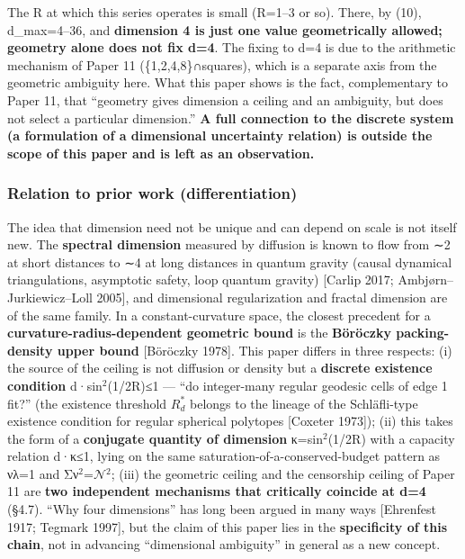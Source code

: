 \documentclass[
]{ltjsarticle}
\begin{document}
The R at which this series operates is small (R=1--3 or so). There, by
(10), d\_max=4--36, and \textbf{dimension 4 is just one value
geometrically allowed; geometry alone does not fix d=4}. The fixing to
d=4 is due to the arithmetic mechanism of Paper 11
(\{1,2,4,8\}∩squares), which is a separate axis from the geometric
ambiguity here. What this paper shows is the fact, complementary to
Paper 11, that ``geometry gives dimension a ceiling and an ambiguity,
but does not select a particular dimension.'' \textbf{A full connection
to the discrete system (a formulation of a dimensional uncertainty
relation) is outside the scope of this paper and is left as an
observation.}

\subsubsection{Relation to prior work
(differentiation)}\label{relation-to-prior-work-differentiation}

The idea that dimension need not be unique and can depend on scale is
not itself new. The \textbf{spectral dimension} measured by diffusion is
known to flow from ∼2 at short distances to ∼4 at long distances in
quantum gravity (causal dynamical triangulations, asymptotic safety,
loop quantum gravity) {[}Carlip 2017; Ambjørn--Jurkiewicz--Loll 2005{]},
and dimensional regularization and fractal dimension are of the same
family. In a constant-curvature space, the closest precedent for a
\textbf{curvature-radius-dependent geometric bound} is the
\textbf{Böröczky packing-density upper bound} {[}Böröczky 1978{]}. This
paper differs in three respects: (i) the source of the ceiling is not
diffusion or density but a \textbf{discrete existence condition}
d·sin\(^{2}\)(1/2R)≤1 --- ``do integer-many regular geodesic cells of
edge 1 fit?'' (the existence threshold \(R^{*}_{d}\) belongs to the
lineage of the Schläfli-type existence condition for regular spherical
polytopes {[}Coxeter 1973{]}); (ii) this takes the form of a
\textbf{conjugate quantity of dimension} κ=sin\(^{2}\)(1/2R) with a
capacity relation d·κ≤1, lying on the same
saturation-of-a-conserved-budget pattern as νλ=1 and
Σν\(^{2}\)=\(\mathcal{N}\)\(^{2}\); (iii) the geometric ceiling and the
censorship ceiling of Paper 11 are \textbf{two independent mechanisms
that critically coincide at d=4} (§4.7). ``Why four dimensions'' has
long been argued in many ways {[}Ehrenfest 1917; Tegmark 1997{]}, but
the claim of this paper lies in the \textbf{specificity of this chain},
not in advancing ``dimensional ambiguity'' in general as a new concept.
\end{document}
